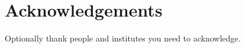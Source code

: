 \documentclass[preprint,12pt, a4paper]{elsarticle}
\begin{document}







\section*{Acknowledgements}
\label{}

Optionally thank people and institutes you need to acknowledge.
\end{document}
